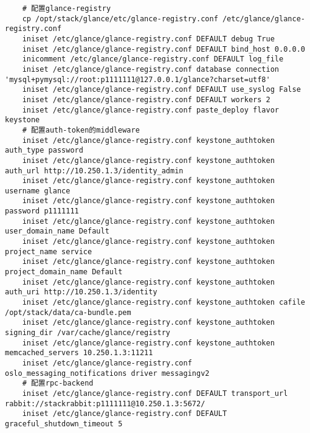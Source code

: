 \documentclass[a4paper,left=1.5cm,right=1.5cm,11pt]{article}
\begin{document}
\begin{lstlisting}
	# 配置glance-registry
    cp /opt/stack/glance/etc/glance-registry.conf /etc/glance/glance-registry.conf
    iniset /etc/glance/glance-registry.conf DEFAULT debug True
    iniset /etc/glance/glance-registry.conf DEFAULT bind_host 0.0.0.0
    inicomment /etc/glance/glance-registry.conf DEFAULT log_file
	iniset /etc/glance/glance-registry.conf database connection 'mysql+pymysql://root:p1111111@127.0.0.1/glance?charset=utf8'
    iniset /etc/glance/glance-registry.conf DEFAULT use_syslog False
    iniset /etc/glance/glance-registry.conf DEFAULT workers 2
    iniset /etc/glance/glance-registry.conf paste_deploy flavor keystone
	# 配置auth-token的middleware
	iniset /etc/glance/glance-registry.conf keystone_authtoken auth_type password
    iniset /etc/glance/glance-registry.conf keystone_authtoken auth_url http://10.250.1.3/identity_admin
    iniset /etc/glance/glance-registry.conf keystone_authtoken username glance
    iniset /etc/glance/glance-registry.conf keystone_authtoken password p1111111
    iniset /etc/glance/glance-registry.conf keystone_authtoken user_domain_name Default
    iniset /etc/glance/glance-registry.conf keystone_authtoken project_name service
    iniset /etc/glance/glance-registry.conf keystone_authtoken project_domain_name Default
    iniset /etc/glance/glance-registry.conf keystone_authtoken auth_uri http://10.250.1.3/identity
    iniset /etc/glance/glance-registry.conf keystone_authtoken cafile /opt/stack/data/ca-bundle.pem
    iniset /etc/glance/glance-registry.conf keystone_authtoken signing_dir /var/cache/glance/registry
    iniset /etc/glance/glance-registry.conf keystone_authtoken memcached_servers 10.250.1.3:11211
    iniset /etc/glance/glance-registry.conf oslo_messaging_notifications driver messagingv2
    # 配置rpc-backend
	iniset /etc/glance/glance-registry.conf DEFAULT transport_url rabbit://stackrabbit:p1111111@10.250.1.3:5672/
	iniset /etc/glance/glance-registry.conf DEFAULT graceful_shutdown_timeout 5


\end{lstlisting}
\end{document}
